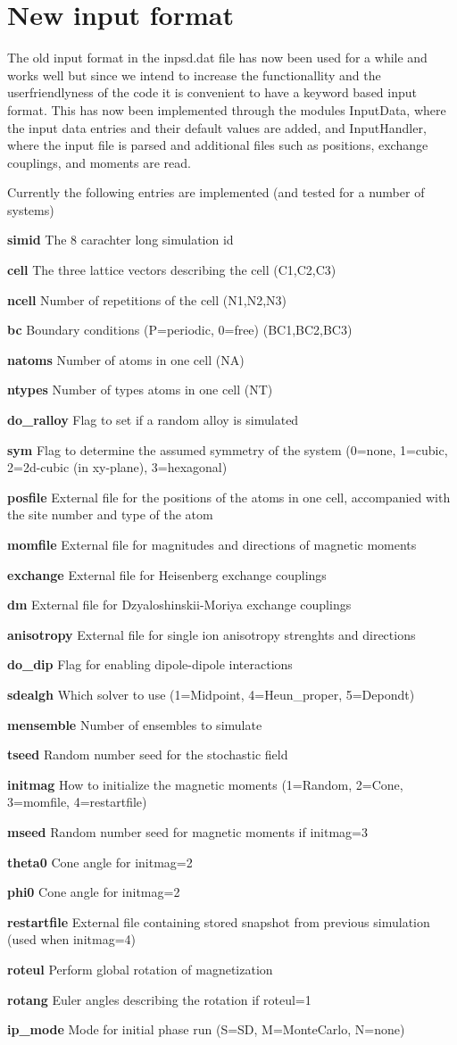 \documentclass{article}
\newcommand\litem[1]{\item{\bfseries #1\enspace}}
\begin{document}
\section{New input format}
The old input format in the inpsd.dat file has now been used for a while and works well but since we intend to increase the functionallity and the userfriendlyness of the code it is convenient to have a keyword based input format. This has now been implemented through the modules InputData, where the input data entries and their default values are added, and InputHandler, where the input file is parsed and additional files such as positions, exchange couplings, and moments are read.
\par
Currently the following entries are implemented (and tested for a number of systems)
\begin{description}
\litem{simid} The 8 carachter long simulation id 
\litem{cell} The three lattice vectors describing the cell (C1,C2,C3)
\litem{ncell} Number of repetitions of the cell (N1,N2,N3)
\litem{bc} Boundary conditions (P=periodic, 0=free) (BC1,BC2,BC3)
\litem{natoms} Number of atoms in one cell (NA)
\litem{ntypes} Number of types atoms in one cell (NT)
\litem{do\_ralloy} Flag to set if a random alloy is simulated
\litem{sym} Flag to determine the assumed symmetry of the system (0=none, 1=cubic, 2=2d-cubic (in xy-plane), 3=hexagonal)
\litem{posfile} External file for the positions of the atoms in one cell,
accompanied with the site number and type of the atom
\litem{momfile} External file for magnitudes and directions of magnetic moments
\litem{exchange} External file for Heisenberg exchange couplings
\litem{dm} External file for Dzyaloshinskii-Moriya exchange couplings
\litem{anisotropy} External file for single ion anisotropy strenghts and directions
\litem{do\_dip} Flag for enabling dipole-dipole interactions
\litem{sdealgh} Which solver to use (1=Midpoint, 4=Heun\_proper, 5=Depondt)
\litem{mensemble} Number of ensembles to simulate 
\litem{tseed} Random number seed for the stochastic field 
\litem{initmag} How to initialize the magnetic moments (1=Random, 2=Cone, 3=momfile, 4=restartfile)
\litem{mseed} Random number seed for magnetic moments if initmag=3
\litem{theta0} Cone angle for initmag=2
\litem{phi0} Cone angle for initmag=2
\litem{restartfile} External file containing stored snapshot from previous simulation (used when initmag=4)
\litem{roteul} Perform global rotation of magnetization
\litem{rotang} Euler angles describing the rotation if roteul=1
\litem{ip\_mode} Mode for initial phase run (S=SD, M=MonteCarlo, N=none)

\end{description}
\end{document}
